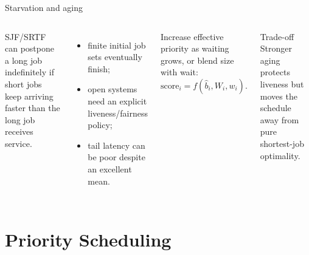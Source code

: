 \documentclass[aspectratio=169,11pt]{beamer}
\begin{document}
\begin{frame}{Starvation and aging}
  \begin{columns}[T,onlytextwidth]
      SJF/SRTF can postpone a long job indefinitely if short jobs keep arriving faster than the long job receives service.
      \begin{itemize}
        \item finite initial job sets eventually finish;
        \item open systems need an explicit liveness/fairness policy;
        \item tail latency can be poor despite an excellent mean.
      \end{itemize}
      \begin{tcolorbox}[title=Aging]
        Increase effective priority as waiting grows, or blend size with wait:
        \[
          \text{score}_i=f(\widehat b_i,W_i,w_i).
        \]
      \end{tcolorbox}
      \begin{alertblock}{Trade-off}
        Stronger aging protects liveness but moves the schedule away from pure shortest-job optimality.
      \end{alertblock}
  \end{columns}
\end{frame}

\section{Priority Scheduling}
\end{document}

